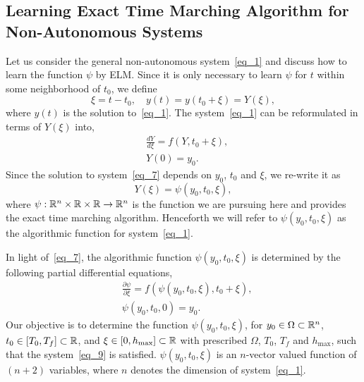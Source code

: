 \subsection{Learning Exact Time Marching Algorithm for Non-Autonomous Systems}

%


Let us consider the general non-autonomous system~\eqref{eq_1} and
discuss how to learn the function $\psi$  by ELM.
Since it is only necessary to learn $\psi$ for $t$ within some neighborhood of $t_0$,
we define
\begin{equation}\label{eq_6}
  \xi = t-t_0, \quad y(t) = y(t_0+\xi) = Y(\xi),
\end{equation}
where $y(t)$ is the solution to~\eqref{eq_1}.
The system~\eqref{eq_1} can be reformulated  in terms of $Y(\xi)$ into,
\begin{subequations}\label{eq_7}
  \begin{align}
    & \frac{dY}{d\xi} = f(Y, t_0+\xi), \\
    & Y(0) = y_0.
  \end{align}
\end{subequations}
%
Since the solution to  system~\eqref{eq_7} depends on $y_0$, $t_0$ and $\xi$,
we re-write it as
\begin{equation}
  Y(\xi) = \psi(y_0,t_0,\xi),
\end{equation}
where  $\psi: \mathbb{R}^n\times\mathbb{R}\times \mathbb{R} \rightarrow \mathbb{R}^n$
is the function we are pursuing here
and provides the exact time marching algorithm.
Henceforth we will refer to $\psi(y_0,t_0,\xi)$ as the algorithmic
function for system~\eqref{eq_1}.


In light of~\eqref{eq_7}, the algorithmic function $\psi(y_0,t_0,\xi)$ is determined by the following
partial differential equations,
\begin{subequations}\label{eq_9}
  \begin{align}
    & \frac{\partial\psi}{\partial\xi} = f(\psi(y_0,t_0,\xi), t_0+\xi), \label{eq_9a} \\
    & \psi(y_0,t_0,0) = y_0. \label{eq_9b}
  \end{align}
\end{subequations}
Our objective  is to determine the function $\psi(y_0,t_0,\xi)$, for
$y_0\in\Omega\subset\mathbb{R}^n$, $t_0\in[T_0,T_f]\subset\mathbb{R}$,
and $\xi\in[0,h_{\max}]\subset\mathbb{R}$
with prescribed $\Omega$, $T_0$, $T_f$ and $h_{\max}$, such that
the system~\eqref{eq_9} is satisfied.
$\psi(y_0,t_0,\xi)$ is an $n$-vector valued function of $(n+2)$ variables,
where $n$ denotes the dimension of system~\eqref{eq_1}.

